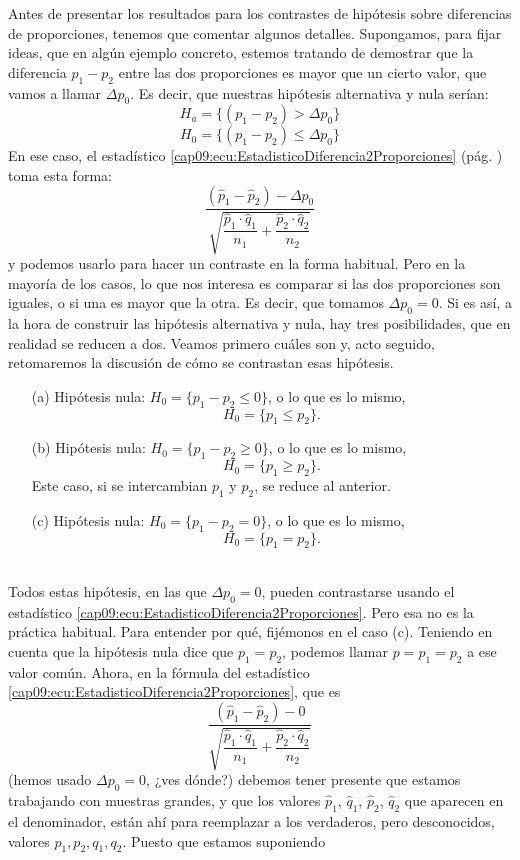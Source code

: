 Antes de presentar los resultados para los contrastes de hipótesis sobre diferencias de
proporciones, tenemos que comentar algunos detalles. Supongamos, para fijar ideas, que en algún
ejemplo concreto, estemos tratando de demostrar que la diferencia $p_1-p_2$ entre las dos
proporciones es mayor que un cierto valor, que vamos a llamar $\Delta p_0$.  Es decir, que nuestras
hipótesis alternativa y nula serían:
\[H_a = \{(p_1-p_2)>\Delta p_0\}\]
\[H_0 = \{(p_1-p_2)\leq\Delta p_0\}\]
En ese caso, el estadístico \ref{cap09:ecu:EstadisticoDiferencia2Proporciones} (pág. \pageref{cap09:ecu:EstadisticoDiferencia2Proporciones}) toma esta forma:
    \[
    \dfrac{\left(\hat p_1-\hat p_2\right)-\Delta p_0}{\sqrt{\dfrac{\hat p_1\cdot\hat q_1}{n_1}+\dfrac{\hat p_2\cdot\hat q_2}{n_2}}}
    \]
y podemos usarlo para hacer un contraste en la forma habitual. Pero en la mayoría de los casos, lo que nos interesa es comparar si las dos proporciones son iguales, o si una es mayor que la otra. Es decir, que tomamos $\Delta p_0=0$. Si es así, a la hora de construir las hipótesis alternativa y nula, hay tres posibilidades, que en realidad se reducen a dos. Veamos primero cuáles son y, acto seguido, retomaremos la discusión de cómo se contrastan esas hipótesis.
\begin{enumerate}
    \item[(a)] Hipótesis nula: $H_0=\{p_1-p_2\leq 0\}$, o lo que es lo mismo,
         \[H_0=\{p_1\leq p_2\}.\]
    \item[(b)] Hipótesis nula: $H_0=\{p_1-p_2\geq 0\}$, o lo que es lo mismo,
         \[H_0=\{p_1\geq p_2\}.\]
         Este caso, si se intercambian $p_1$ y $p_2$, se reduce al anterior.
    \item[(c)] Hipótesis nula: $H_0=\{p_1-p_2=0\}$, o lo que es lo mismo,
         \[H_0=\{p_1 = p_2\}.\]
        \quad\\
\end{enumerate}
Todos estas hipótesis, en las que $\Delta p_0=0$, pueden contrastarse usando el estadístico \ref{cap09:ecu:EstadisticoDiferencia2Proporciones}.  Pero esa no es la práctica habitual. Para entender por qué, fijémonos en el caso (c). Teniendo en cuenta que la hipótesis nula dice que $p_1=p_2$, podemos llamar $p=p_1=p_2$ a ese valor común. Ahora, en la fórmula del estadístico \ref{cap09:ecu:EstadisticoDiferencia2Proporciones}, que es
    \[
        \dfrac{\left(\hat p_1-\hat p_2\right)-0}{\sqrt{\dfrac{\hat p_1\cdot\hat q_1}{n_1}+\dfrac{\hat p_2\cdot\hat q_2}{n_2}}}
    \]
(hemos usado $\Delta p_0=0$, ¿ves dónde?) debemos tener presente que estamos trabajando con muestras grandes, y que los valores $\hat p_1$, $\hat q_1$, $\hat p_2$, $\hat q_2$ que aparecen en el denominador, están ahí para reemplazar a los verdaderos, pero desconocidos, valores $p_1, p_2, q_1, q_2$. Puesto que estamos suponiendo
